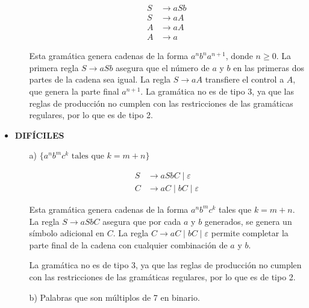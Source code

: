 \documentclass[12pt]{report} %
\begin{document}
\begin{ejercicio}
\begin{itemize}
\begin{itemize}
\begin{solucion}[media.d]
        \begin{align*}
        S &\rightarrow aSb \\
        S &\rightarrow aA \\
        A &\rightarrow aA \\
        A &\rightarrow a
        \end{align*}

        Esta gramática genera cadenas de la forma $a^n b^n a^{n+1}$, donde $n \geq 0$. La primera regla $S \rightarrow aSb$ asegura que el número de $a$ y $b$ en las primeras dos partes de la cadena sea igual. La regla $S \rightarrow aA$ transfiere el control a $A$, que genera la parte final $a^{n+1}$. La gramática no es de tipo 3, ya que las reglas de producción no cumplen con las restricciones de las gramáticas regulares, por lo que es de tipo 2.

        \end{solucion}


    \end{itemize}

    \item \textbf{DIFÍCILES}
    \begin{itemize}
        \item[a)] $\{a^n b^m c^k \text{ tales que } k = m + n\}$


        \begin{solucion}[difícil.a]

        \begin{align*}
        S &\rightarrow aSbC \mid \varepsilon \\
        C &\rightarrow aC \mid bC \mid \varepsilon
        \end{align*}

        Esta gramática genera cadenas de la forma $a^n b^m c^k$ tales que $k = m + n$. La regla $S \rightarrow aSbC$ asegura que por cada $a$ y $b$ generados, se genera un símbolo adicional en $C$. La regla $C \rightarrow aC \mid bC \mid \varepsilon$ permite completar la parte final de la cadena con cualquier combinación de $a$ y $b$.

        La gramática no es de tipo 3, ya que las reglas de producción no cumplen con las restricciones de las gramáticas regulares, por lo que es de tipo 2.

        \end{solucion}



        \item[b)] Palabras que son múltiplos de 7 en binario.



\end{itemize}
\end{itemize}
\end{ejercicio}
\end{document}
